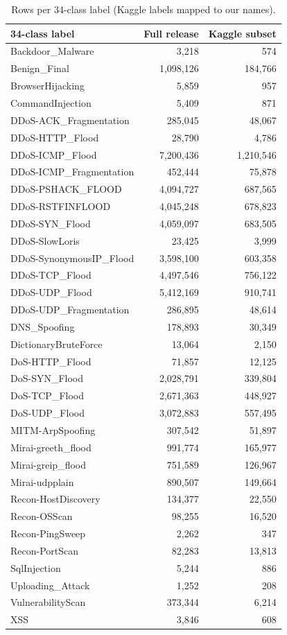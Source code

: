 \begin{table}[!t]
\centering
\caption{Rows per 34-class label (Kaggle labels mapped to our names).}\label{tab:counts34}
\scriptsize
\setlength{\tabcolsep}{3pt}
\begin{tabular}{lrr}
\toprule
\textbf{34-class label} & \textbf{Full release} & \textbf{Kaggle subset} \\
\midrule
Backdoor\_Malware & 3,218 & 574 \\
Benign\_Final & 1,098,126 & 184,766 \\
BrowserHijacking & 5,859 & 957 \\
CommandInjection & 5,409 & 871 \\
DDoS-ACK\_Fragmentation & 285,045 & 48,067 \\
DDoS-HTTP\_Flood & 28,790 & 4,786 \\
DDoS-ICMP\_Flood & 7,200,436 & 1,210,546 \\
DDoS-ICMP\_Fragmentation & 452,444 & 75,878 \\
DDoS-PSHACK\_FLOOD & 4,094,727 & 687,565 \\
DDoS-RSTFINFLOOD & 4,045,248 & 678,823 \\
DDoS-SYN\_Flood & 4,059,097 & 683,505 \\
DDoS-SlowLoris & 23,425 & 3,999 \\
DDoS-SynonymousIP\_Flood & 3,598,100 & 603,358 \\
DDoS-TCP\_Flood & 4,497,546 & 756,122 \\
DDoS-UDP\_Flood & 5,412,169 & 910,741 \\
DDoS-UDP\_Fragmentation & 286,895 & 48,614 \\
DNS\_Spoofing & 178,893 & 30,349 \\
DictionaryBruteForce & 13,064 & 2,150 \\
DoS-HTTP\_Flood & 71,857 & 12,125 \\
DoS-SYN\_Flood & 2,028,791 & 339,804 \\
DoS-TCP\_Flood & 2,671,363 & 448,927 \\
DoS-UDP\_Flood & 3,072,883 & 557,495 \\
MITM-ArpSpoofing & 307,542 & 51,897 \\
Mirai-greeth\_flood & 991,774 & 165,977 \\
Mirai-greip\_flood & 751,589 & 126,967 \\
Mirai-udpplain & 890,507 & 149,664 \\
Recon-HostDiscovery & 134,377 & 22,550 \\
Recon-OSScan & 98,255 & 16,520 \\
Recon-PingSweep & 2,262 & 347 \\
Recon-PortScan & 82,283 & 13,813 \\
SqlInjection & 5,244 & 886 \\
Uploading\_Attack & 1,252 & 208 \\
VulnerabilityScan & 373,344 & 6,214 \\
XSS & 3,846 & 608 \\
\bottomrule
\end{tabular}
\end{table}
